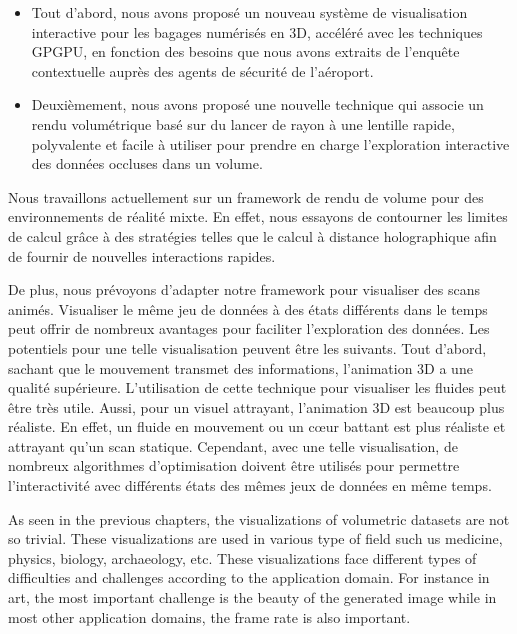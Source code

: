 \begin{itemize}

\item Tout d'abord, nous avons proposé un nouveau système de visualisation interactive pour les bagages numérisés en 3D, accéléré avec les techniques GPGPU, en fonction des besoins que nous avons extraits de l'enquête contextuelle auprès des agents de sécurité de l'aéroport.

\item Deuxièmement, nous avons proposé une nouvelle technique qui associe un rendu volumétrique basé sur du lancer de rayon à une lentille rapide, polyvalente et facile à utiliser pour prendre en charge l'exploration interactive des données occluses dans un  volume.

\end{itemize}


Nous travaillons actuellement sur un framework de rendu de volume pour des environnements de réalité mixte. En effet, nous essayons de contourner les limites de calcul grâce à des stratégies telles que le calcul à distance holographique afin de fournir de nouvelles interactions rapides.

De plus, nous prévoyons d’adapter notre framework pour visualiser des scans animés. Visualiser le même jeu de données à des états différents dans le temps peut offrir de nombreux avantages pour faciliter l'exploration des données. Les potentiels pour une telle visualisation peuvent être les suivants. Tout d’abord, sachant que le mouvement transmet des informations, l’animation 3D a une qualité supérieure. L'utilisation de cette technique pour visualiser les fluides peut être très utile. Aussi, pour un visuel
 attrayant, l'animation 3D est beaucoup plus réaliste. En effet, un fluide en mouvement ou un cœur battant est plus réaliste et
 attrayant qu'un scan statique. Cependant, avec une telle visualisation, de nombreux algorithmes d’optimisation doivent être utilisés pour
     permettre l'interactivité avec différents états des mêmes jeux de données en même temps.

\NewPage


As seen in the previous chapters, the visualizations of volumetric datasets are not so trivial. These visualizations are used in various type of field such us medicine, physics, biology, archaeology, etc. These visualizations face different types of difficulties and challenges according to the application domain. For instance in art, the most important challenge is the beauty of the generated image while in most other application domains, the frame rate is also important.


